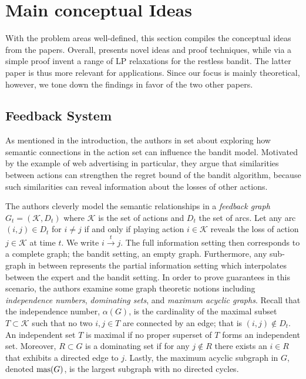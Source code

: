 \section{Main conceptual Ideas}
With the problem areas well-defined, this section compiles the conceptual ideas from the papers. Overall, \citep{alon, hazan} presents novel ideas and proof techniques, while \citep{bertsimas} via a simple proof invent a range of LP relaxations for the restless bandit. The latter paper is thus more relevant for applications. Since our focus is mainly theoretical, however, we tone down the findings \citep{bertsimas} in favor of the two other papers.

\subsection{Feedback System}
As mentioned in the introduction, the authors in \citep{alon} set about exploring how semantic connections in the action set can influence the bandit model. Motivated by the example of web advertising in particular, they argue that similarities between actions can strengthen the regret bound of the bandit algorithm, because such similarities can reveal information about the losses of other actions. 

The authors cleverly model the semantic relationships in a \textit{feedback graph} $G_t=(\mathcal{K},D_t)$ where $\mathcal{K}$ is the set of actions and $D_t$ the set of arcs. Let any arc $(i,j)\in D_t$ for $i\not=j$ if and only if playing action $i\in\mathcal{K}$ reveals the loss of action $j\in \mathcal{K}$ at time $t$. We write $i\overset{t}{\to}j$. The full information setting then corresponds to a complete graph; the bandit setting, an empty graph. Furthermore, any sub-graph in between represents the partial information setting which interpolates between the expert and the bandit setting. In order to prove guarantees in this scenario, the authors examine some graph theoretic notions including \textit{independence numbers}, \textit{dominating sets}, and \textit{maximum acyclic graphs}. Recall that the independence number, $\alpha(G)$, is the cardinality of the maximal subset $T\subset \mathcal{K}$ such that no two $i,j\in T$ are connected by an edge; that is $(i,j)\not\in D_t$. An independent set $T$ is maximal if no proper superset of $T$ forms an independent set. Moreover, $R\subset G$ is a dominating set if for any $j\not\in R$ there exists an $i\in R$ that exhibits a directed edge to $j$. Lastly, the maximum acyclic subgraph in $G$, denoted $\text{mas}(G)$, is the largest subgraph with no directed cycles. 

